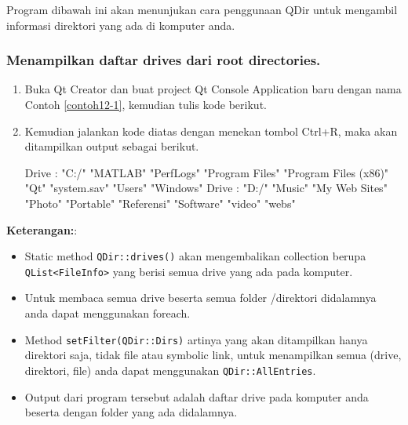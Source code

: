 Program dibawah ini akan menunjukan cara penggunaan QDir untuk mengambil
informasi direktori yang ada di komputer anda.

\subsubsection*{Menampilkan daftar drives dari root directories.}

\begin{enumerate}

\item
  Buka Qt Creator dan buat project Qt Console Application baru dengan
  nama Contoh \ref{contoh12-1}, kemudian tulis kode berikut.



\item
  Kemudian jalankan kode diatas dengan menekan tombol Ctrl+R, maka akan
  ditampilkan output sebagai berikut.
  \begin{lcverbatim}
Drive :  "C:/"
  "MATLAB"
  "PerfLogs"
  "Program Files"
  "Program Files (x86)"
  "Qt"
  "system.sav"
  "Users"
  "Windows"
Drive :  "D:/"
  "Music"
  "My Web Sites"
  "Photo"
  "Portable"
  "Referensi"
  "Software"
  "video"
  "webs"

\end{lcverbatim}
\end{enumerate}

\textbf{Keterangan:}:

\begin{itemize}

\item
  Static method \texttt{QDir::drives()} akan mengembalikan collection
  berupa \texttt{QList\textless{}FileInfo\textgreater{}} yang berisi
  semua drive yang ada pada komputer.
\item
  Untuk membaca semua drive beserta semua folder /direktori didalamnya
  anda dapat menggunakan foreach.
\item
  Method \texttt{setFilter(QDir::Dirs)} artinya yang akan ditampilkan
  hanya direktori saja, tidak file atau symbolic link, untuk menampilkan
  semua (drive, direktori, file) anda dapat menggunakan
  \texttt{QDir::AllEntries}.
\item
  Output dari program tersebut adalah daftar drive pada komputer anda
  beserta dengan folder yang ada didalamnya.
\end{itemize}

